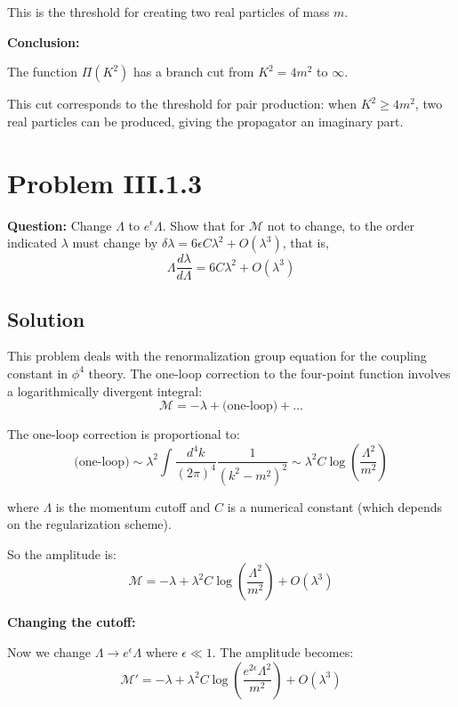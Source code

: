 \documentclass[12pt]{article}
\begin{document}
This is the threshold for creating two real particles of mass $m$.

\textbf{Conclusion:}

The function $\Pi(K^2)$ has a branch cut from $K^2 = 4m^2$ to $\infty$.

This cut corresponds to the threshold for pair production: when $K^2 \geq 4m^2$, two real particles can be produced, giving the propagator an imaginary part.

\section*{Problem III.1.3}
\textbf{Question:} Change $\Lambda$ to $e^\epsilon \Lambda$. Show that for $\mathcal{M}$ not to change, to the order indicated $\lambda$ must change by $\delta\lambda = 6\epsilon C\lambda^2 + O(\lambda^3)$, that is,
$$
\Lambda \frac{d\lambda}{d\Lambda} = 6C\lambda^2 + O(\lambda^3)
$$

\subsection*{Solution}

This problem deals with the renormalization group equation for the coupling constant in $\phi^4$ theory. The one-loop correction to the four-point function involves a logarithmically divergent integral:
\begin{equation}
\mathcal{M} = -\lambda + \text{(one-loop)} + \ldots
\end{equation}

The one-loop correction is proportional to:
\begin{equation}
\text{(one-loop)} \sim \lambda^2 \int \frac{d^4k}{(2\pi)^4} \frac{1}{(k^2 - m^2)^2} \sim \lambda^2 C \log\left(\frac{\Lambda^2}{m^2}\right)
\end{equation}

where $\Lambda$ is the momentum cutoff and $C$ is a numerical constant (which depends on the regularization scheme).

So the amplitude is:
\begin{equation}
\mathcal{M} = -\lambda + \lambda^2 C \log\left(\frac{\Lambda^2}{m^2}\right) + O(\lambda^3)
\end{equation}

\textbf{Changing the cutoff:}

Now we change $\Lambda \to e^\epsilon \Lambda$ where $\epsilon \ll 1$. The amplitude becomes:
\begin{equation}
\mathcal{M}' = -\lambda + \lambda^2 C \log\left(\frac{e^{2\epsilon}\Lambda^2}{m^2}\right) + O(\lambda^3)
\end{equation}
\end{document}
